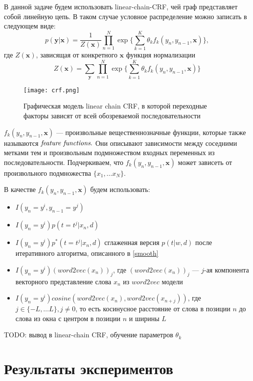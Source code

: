 \documentclass[pdftex,ptm,12pt,a4paper]{report}
\theoremstyle{definition}
\begin{document}
В данной задаче будем использовать linear-chain-CRF, чей граф представляет собой линейную цепь. В таком случае условное распределение можно записать в следующем виде:
\[
p(\boldsymbol{y}|\boldsymbol{x}) = \frac{1}{Z(\boldsymbol{x})} \prod_{n=1}^{N} \exp{\{
	\sum_{k=1}^{K}\theta_{k}f_k(y_n, y_{n-1}, \boldsymbol{x})
	\}},
\]
где $Z(\boldsymbol{x})$, зависящая от конкретного $\boldsymbol{x}$ функция нормализации
\[
Z(\boldsymbol{x}) = \sum_{\boldsymbol{y}}\prod_{n=1}^{N}\exp{ \{
	\sum_{k=1}^{K}\theta_{k}f_k(y_n, y_{n-1}, \boldsymbol{x}) \}
}
\]
\begin{figure}[t]
	\begin{center}
		\texttt{[image: crf.png]}
		\caption{Графическая модель linear chain CRF, в которой переходные факторы зависят от всей обозреваемой последовательности \cite{crftut:fnt}}
		\label{fig:crf_image}
	\end{center}
\end{figure}

$f_k(y_n, y_{n-1}, \boldsymbol{x})$ --- произвольные вещественнозначные функции, которые также называются $\emph{feature functions}.$ Они описывают зависимости между соседними метками тем и произвольным подмножеством входных переменных из последовательности. Подчеркиваем, что $f_k(y_n, y_{n-1}, \boldsymbol{x})$  может зависеть от произвольного подмножества $\{x_1, \dots x_N\}$.

В качестве $f_k(y_n, y_{n-1}, \boldsymbol{x})$ будем использовать:
\begin{itemize} 
	\item $I(y_n=y^i, y_{n-1}=y^j)$
	\item $I(y_n=y^i)p(t=t^j|x_n, d)$
	\item $I(y_n=y^i)p^{*}(t=t^j|x_n, d)$ сглаженная версия $p(t|w, d)$ после итеративного алгоритма, описанного в \ref{smooth}
	\item $I(y_n=y^i)(word2vec(x_n))_{j}$, где $(word2vec(x_n))_{j}$ --- $j$-ая компонента векторного представление слова $x_n$ из $word2vec$ модели
	\item $I(y_n=y^i)cosine(word2vec(x_n), word2vec(x_{n+j}))$, где $j \in \{-L, \dots L\}, j \ne 0$, то есть косинусное расстояние от слова в позиции $n$ до слова из окна с центром в позиции $n$ и ширины $L$ 
\end{itemize}

TODO: вывод в linear-chain CRF, обучение параметров $\theta_k$ 


\chapter{Результаты экспериментов}
\end{document}
